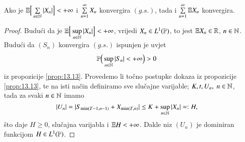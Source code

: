 \begin{prop}    \label{prop:13.14}
    Ako je $\mathbb{E} \Big[ \sum\limits_{n \in \mathbb{N}} |X_n| \Big] < +\infty$ i $\sum\limits_{n = 1}^{\infty} X_n$ konvergira $(g.s.)$, tada i $\sum\limits_{n = 1}^{\infty} \mathbb{E} X_n$ konvergira.
\end{prop}

\begin{proof}
    Budu\' ci da je $\mathbb{E} \Big[\sup\limits_{n \in \mathbb{N}} |X_n| \Big] < +\infty$, vrijedi $X_n \in L^1 (\mathbb{P})$, to jest $\mathbb{E} X_n \in \mathbb{R}$, $n \in \mathbb{N}$.
    Budu\' ci da $(S_n)$ konvergira $(g.s.)$ ispunjen je uvjet
    \begin{equation*}
        \mathbb{P} \Big( \sup\limits_{n \in \mathbb{N}} |S_n| < +\infty \Big) > 0
    \end{equation*}
    iz propozicije \ref{prop:13.13}.
    Provedemo li to\v cno postupke dokaza iz propozicije \ref{prop:13.13}, te na isti na\v cin definiramo sve slu\v cajne varijable; $K, t, U_n, \; n \in \mathbb{N}$, tada za svaki $n \in \mathbb{N}$ imamo
    \begin{equation*}
        |U_n| = |S_{\min (T - 1, n - 1)} + X_{\min (T, n)}| \leq K + \sup\limits_{n \in \mathbb{N}} |X_n| =: H,
    \end{equation*}
    \v sto daje $H \geq 0$, slu\v cajna varijabla i $\mathbb{E} H < + \infty$.
    Dakle niz $(U_n)$ je dominiran funkcijom $H \in L^1 (\mathbb{P})$.


\end{proof}

